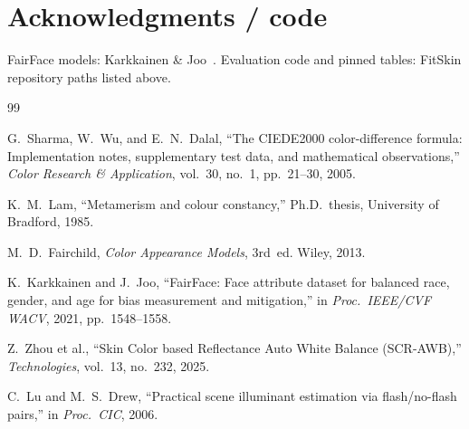 \documentclass[11pt]{article}
\begin{document}
\section*{Acknowledgments / code}
FairFace models: Karkkainen \& Joo~\cite{karkkainen2021fairface}.
Evaluation code and pinned tables: FitSkin repository paths listed above.

\begin{thebibliography}{99}

G.~Sharma, W.~Wu, and E.~N.~Dalal,
``The CIEDE2000 color-difference formula: Implementation notes, supplementary test data, and mathematical observations,''
\textit{Color Research \& Application}, vol.~30, no.~1, pp.~21--30, 2005.

K.~M.~Lam,
``Metamerism and colour constancy,''
Ph.D.\ thesis, University of Bradford, 1985.

M.~D.~Fairchild,
\textit{Color Appearance Models}, 3rd~ed.
Wiley, 2013.

K.~Karkkainen and J.~Joo,
``FairFace: Face attribute dataset for balanced race, gender, and age for bias measurement and mitigation,''
in \textit{Proc.\ IEEE/CVF WACV}, 2021, pp.~1548--1558.

Z.~Zhou et al.,
``Skin Color based Reflectance Auto White Balance (SCR-AWB),''
\textit{Technologies}, vol.~13, no.~232, 2025.

C.~Lu and M.~S.~Drew,
``Practical scene illuminant estimation via flash/no-flash pairs,''
in \textit{Proc.\ CIC}, 2006.

\end{thebibliography}
\end{document}
